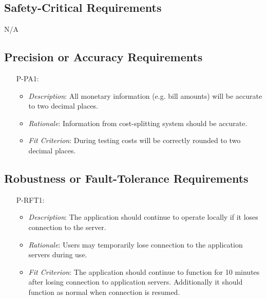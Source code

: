 \documentclass[12pt]{article}
\begin{document}
\subsection{Safety-Critical Requirements}

N/A

\subsection{Precision or Accuracy Requirements}
\noindent \begin{itemize}
    \item[P-PA1:] 
        \begin{itemize}
            \item \textit{Description}: All monetary information (e.g. bill amounts) will be accurate to two decimal places. 
            \item \textit{Rationale}: Information from cost-splitting system should be accurate.
            \item \textit{Fit Criterion}: During testing costs will be correctly rounded to two decimal places.
        \end{itemize}
\end{itemize}
\subsection{Robustness or Fault-Tolerance Requirements}
\noindent \begin{itemize}
    \item[P-RFT1:] 
        \begin{itemize}
            \item \textit{Description}: The application should continue to operate locally if it loses connection to the server.
            \item \textit{Rationale}: Users may temporarily lose connection to the application servers during use.
            \item \textit{Fit Criterion}: The application should continue to function for 10 minutes after losing connection to application servers. Additionally it should function as normal when connection is resumed.
        \end{itemize}
\end{itemize}
\end{document}
